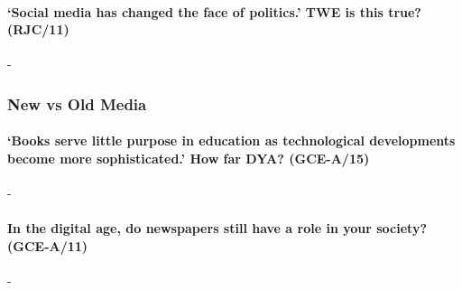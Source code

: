 \documentclass[../../main]{subfiles}
\begin{document}
\paragraph{`Social media has changed the face of politics.' TWE is this true? (RJC/11)}-

\subsubsection{New vs Old Media}

\paragraph{`Books serve little purpose in education as technological developments become more sophisticated.' How far DYA? (GCE-A/15)}-

\paragraph{In the digital age, do newspapers still have a role in your society? (GCE-A/11)}-
\end{document}
